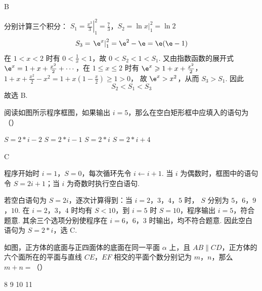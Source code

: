 \begin{answer}
B
\end{answer}

\begin{solution}
分别计算三个积分：
\(S_1=\left.\frac{x^3}{3}\right|_1^2=\frac{7}{3}\)，\(S_2=\left.\ln x\right|_1^2=\ln2\)
\[
S_3=\left.\e^x\right|_1^2=\e^2-\e=\e(\e-1)
\]
在 \(1<x<2\) 时有 \(0<\frac{1}{x}<1\)，故 \(0<S_2<1<S_1\). 又由指数函数的展开式
\(\e^x=1+x+\frac{x^2}{2}+\cdots\)，在 \(1\leqslant x\leqslant2\) 时有
\(\e^x\geqslant1+x+\frac{x^2}{2}\)，\(1+x+\frac{x^2}{2}-x^2=1+x\left(1-\frac{x}{2}\right)\geqslant1>0\)，
故 \(\e^x>x^2\)，从而 \(S_3>S_1\). 因此
\[
S_2<S_1<S_3
\]
故选 B.
\end{solution}

\begin{problem}
阅读如图所示程序框图，如果输出 \(i = 5\)，那么在空白矩形框中应填入的语句为（\quad）


\choices
    {\(S = 2 * i - 2\)}
    {\(S = 2 * i - 1\)}
    {\(S = 2 * i\)}
    {\(S = 2 * i + 4\)}
\end{problem}

\begin{answer}
C
\end{answer}

\begin{solution}
程序开始时 \(i=1\)，\(S=0\)，每次循环先令 \(i\leftarrow i+1\). 当 \(i\) 为偶数时，框图中的语句令 \(S=2i+1\)；当 \(i\) 为奇数时执行空白语句.

若空白语句为 \(S=2i\)，逐次计算得到：当 \(i=2\)，\(3\)，\(4\)，\(5\) 时，
\(S\) 分别为 \(5\)，\(6\)，\(9\)，\(10\).
在 \(i=2\)，\(3\)，\(4\) 时均有 \(S<10\)，到 \(i=5\) 时 \(S=10\)，程序输出 \(i=5\)，符合题意. 其余三个选项分别使程序在 \(i=6\)，\(6\)，\(3\) 时输出，均不符合题意. 因此空白语句为 \(S=2*i\)，选 C.
\end{solution}

\begin{problem}
如图，正方体的底面与正四面体的底面在同一平面 \(\alpha\) 上，且 \(AB \parallel CD\)，正方体的六个面所在的平面与直线 \(CE\)，\(EF\) 相交的平面个数分别记为 \(m\)，\(n\)，那么 \(m + n =\)（\quad）


\choices
    {8}
    {9}
    {10}
    {11}
\end{problem}

